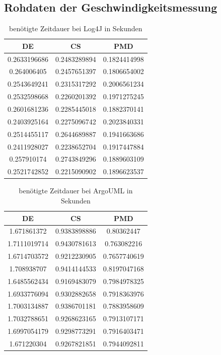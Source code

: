 \begin{appendices}
\chapter{Rohdaten der Geschwindigkeitsmessung}
\begin{table}[]
    \centering
    \begin{tabular}{c|c|c}
DE & CS &PMD\\\hline
0.2633196686&0.2483289894&0.1824414998 \\\hline
0.264006405&0.2457651397&0.1806654002 \\\hline
0.2543649241&0.2315317292&0.2006561234 \\\hline
0.2532598668&0.2260201392&0.1971275245 \\\hline
0.2601681236&0.2285445018&0.1882370141 \\\hline
0.2403925164&0.2275096742&0.2023840331 \\\hline
0.2514455117&0.2644689887&0.1941663686 \\\hline
0.2411928027&0.2238652704&0.1917447884 \\\hline
0.257910174&0.2743849296&0.1889603109 \\\hline
0.2521742852&0.2215090902&0.1896623537 \\\hline
    \end{tabular}
    \caption{benötigte Zeitdauer bei Log4J in Sekunden}
    \label{tab:raw_log4j}
\end{table}


\begin{table}[]
    \centering
    \begin{tabular}{c|c|c}
DE & CS &PMD\\\hline
1.671861372&0.9383898886&0.80362447 \\\hline
1.7111019714&0.9430781613&0.763082216 \\\hline
1.6714703572&0.9212230905&0.7657740619 \\\hline
1.708938707&0.9414144533&0.8197047168 \\\hline
1.6485562434&0.9169483079&0.7984978325 \\\hline
1.6933776094&0.9302882658&0.7918363976 \\\hline
1.7003134887&0.9386701181&0.7883958609 \\\hline
1.7032788651&0.9268623165&0.7913107171 \\\hline
1.6997054179&0.9298773291&0.7916403471 \\\hline
1.671220304&0.9267821851&0.7944092811 \\\hline
    \end{tabular}
    \caption{benötigte Zeitdauer bei ArgoUML in Sekunden}
    \label{tab:raw_argo}
\end{table}



\end{appendices}
